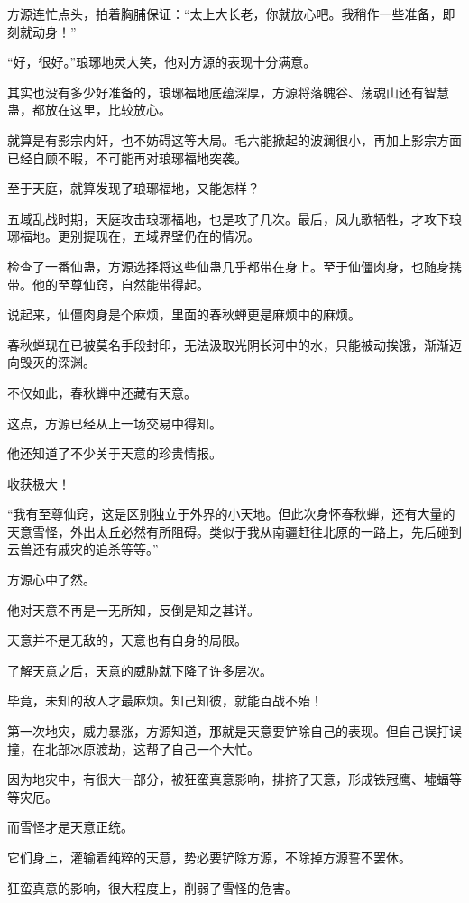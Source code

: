 \begin{this_body}
方源连忙点头，拍着胸脯保证：“太上大长老，你就放心吧。我稍作一些准备，即刻就动身！”

“好，很好。”琅琊地灵大笑，他对方源的表现十分满意。

其实也没有多少好准备的，琅琊福地底蕴深厚，方源将落魄谷、荡魂山还有智慧蛊，都放在这里，比较放心。

就算是有影宗内奸，也不妨碍这等大局。毛六能掀起的波澜很小，再加上影宗方面已经自顾不暇，不可能再对琅琊福地突袭。

至于天庭，就算发现了琅琊福地，又能怎样？

五域乱战时期，天庭攻击琅琊福地，也是攻了几次。最后，凤九歌牺牲，才攻下琅琊福地。更别提现在，五域界壁仍在的情况。

检查了一番仙蛊，方源选择将这些仙蛊几乎都带在身上。至于仙僵肉身，也随身携带。他的至尊仙窍，自然能带得起。

说起来，仙僵肉身是个麻烦，里面的春秋蝉更是麻烦中的麻烦。

春秋蝉现在已被莫名手段封印，无法汲取光阴长河中的水，只能被动挨饿，渐渐迈向毁灭的深渊。

不仅如此，春秋蝉中还藏有天意。

这点，方源已经从上一场交易中得知。

他还知道了不少关于天意的珍贵情报。

收获极大！

“我有至尊仙窍，这是区别独立于外界的小天地。但此次身怀春秋蝉，还有大量的天意雪怪，外出太丘必然有所阻碍。类似于我从南疆赶往北原的一路上，先后碰到云兽还有戚灾的追杀等等。”

方源心中了然。

他对天意不再是一无所知，反倒是知之甚详。

天意并不是无敌的，天意也有自身的局限。

了解天意之后，天意的威胁就下降了许多层次。

毕竟，未知的敌人才最麻烦。知己知彼，就能百战不殆！

第一次地灾，威力暴涨，方源知道，那就是天意要铲除自己的表现。但自己误打误撞，在北部冰原渡劫，这帮了自己一个大忙。

因为地灾中，有很大一部分，被狂蛮真意影响，排挤了天意，形成铁冠鹰、墟蝠等等灾厄。

而雪怪才是天意正统。

它们身上，灌输着纯粹的天意，势必要铲除方源，不除掉方源誓不罢休。

狂蛮真意的影响，很大程度上，削弱了雪怪的危害。


\end{this_body}
